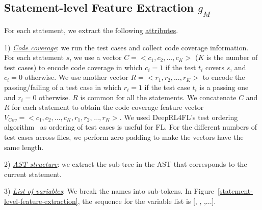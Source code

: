 \subsection{Statement-level Feature Extraction $g_M$}
\label{sec:stmt-level-feature-extraction}

For each statement, we extract the following \underline{attributes}.

1) {\em \underline{Code coverage}}: we run the test cases and collect
code coverage information. For each statement $s$, we use a vector $C
= <c_1, c_2, ..., c_K>$ ($K$ is the number of test cases) to encode
code coverage in which $c_i=1$ if the test $t_i$ covers $s$, and
$c_i=0$ otherwise. We use another vector $R = <r_1, r_2, ..., r_K>$ to
encode the passing/failing of a test case in which $r_i=1$ if the test
case $t_i$ is a passing one and $r_i=0$ otherwise. $R$ is common for
all the statements. We concatenate $C$ and $R$ for each statement to
obtain the code coverage feature vector $V_{Cov} = <c_1, c_2, ...,
c_K, r_1, r_2, ..., r_K>$.
%
We used DeepRL4FL's test ordering algorithm~\cite{icse21-fl} as
ordering of test cases is useful for FL.
%
For the different numbers of test cases across files, we perform zero
padding to make the vectors have the same length.

2) {\em \underline{AST structure}}: we extract the sub-tree in the AST that
corresponds to the current statement.

3) {\em \underline{List of variables}}:
We break the names into sub-tokens. In
Figure~\ref{statement-level-feature-extraction}, the sequence for the
variable list is [, , ,...].





